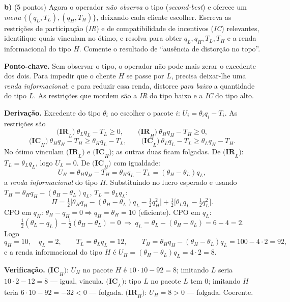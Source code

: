 \textbf{b)} (5 pontos) Agora o operador \emph{não observa} o tipo (\emph{second-best}) e oferece um \emph{menu} $\{(q_L,T_L),(q_H,T_H)\}$, deixando cada cliente escolher. Escreva as restrições de participação (\emph{IR}) e de compatibilidade de incentivos (\emph{IC}) relevantes, identifique quais vinculam no ótimo, e resolva para obter $q_L, q_H, T_L, T_H$ e a renda informacional do tipo $H$. Comente o resultado de ``ausência de distorção no topo''.
\resolucaobox{7.2cm}
\begin{solucao}
\textbf{Ponto-chave.} Sem observar o tipo, o operador não pode mais zerar o excedente dos dois. Para impedir que o cliente $H$ se passe por $L$, precisa deixar-lhe uma \emph{renda informacional}; e para reduzir essa renda, distorce \emph{para baixo} a quantidade do tipo $L$. As restrições que mordem são a \emph{IR} do tipo baixo e a \emph{IC} do tipo alto.

\textbf{Derivação.} Excedente do tipo $\theta_i$ ao escolher o pacote $i$: $U_i = \theta_i q_i - T_i$. As restrições são
\[
\textbf{(IR}_L\textbf{)}\ \theta_L q_L - T_L \ge 0,\qquad
\textbf{(IR}_H\textbf{)}\ \theta_H q_H - T_H \ge 0,
\]
\[
\textbf{(IC}_H\textbf{)}\ \theta_H q_H - T_H \ge \theta_H q_L - T_L,\qquad
\textbf{(IC}_L\textbf{)}\ \theta_L q_L - T_L \ge \theta_L q_H - T_H.
\]
No ótimo vinculam $\textbf{(IR}_L\textbf{)}$ e $\textbf{(IC}_H\textbf{)}$; as outras duas ficam folgadas. De $\textbf{(IR}_L\textbf{)}$: $T_L = \theta_L q_L$, logo $U_L = 0$. De $\textbf{(IC}_H\textbf{)}$ com igualdade:
\[
U_H = \theta_H q_H - T_H = \theta_H q_L - T_L = (\theta_H - \theta_L) q_L,
\]
a \emph{renda informacional} do tipo $H$. Substituindo no lucro esperado e usando $T_H = \theta_H q_H - (\theta_H-\theta_L)q_L$, $T_L = \theta_L q_L$:
\[
\Pi = \tfrac{1}{2}\Big[\theta_H q_H - (\theta_H-\theta_L)q_L - \tfrac{1}{2}q_H^2\Big] + \tfrac{1}{2}\Big[\theta_L q_L - \tfrac{1}{2}q_L^2\Big].
\]
CPO em $q_H$: $\theta_H - q_H = 0 \Rightarrow q_H = \theta_H = 10$ (eficiente). CPO em $q_L$:
\[
\tfrac{1}{2}(\theta_L - q_L) - \tfrac{1}{2}(\theta_H - \theta_L) = 0
\ \Longrightarrow\ q_L = \theta_L - (\theta_H - \theta_L) = 6 - 4 = 2.
\]
Logo
\[
q_H = 10,\quad q_L = 2,\qquad
T_L = \theta_L q_L = 12,\qquad
T_H = \theta_H q_H - (\theta_H-\theta_L)q_L = 100 - 4\cdot 2 = 92,
\]
e a renda informacional do tipo $H$ é $U_H = (\theta_H-\theta_L)q_L = 4\cdot 2 = 8$.

\textbf{Verificação.} $\textbf{(IC}_H\textbf{)}$: $U_H$ no pacote $H$ é $10\cdot 10 - 92 = 8$; imitando $L$ seria $10\cdot 2 - 12 = 8$ --- igual, vincula. $\textbf{(IC}_L\textbf{)}$: tipo $L$ no pacote $L$ tem $0$; imitando $H$ teria $6\cdot 10 - 92 = -32 < 0$ --- folgada. $\textbf{(IR}_H\textbf{)}$: $U_H = 8 > 0$ --- folgada. Coerente.


\end{solucao}
